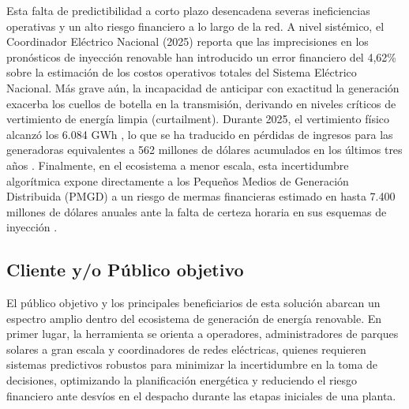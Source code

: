 Esta falta de predictibilidad a corto plazo desencadena severas ineficiencias operativas y un alto riesgo financiero a lo largo de la red. A nivel sistémico, el Coordinador Eléctrico Nacional (2025) reporta que las imprecisiones en los pronósticos de inyección renovable han introducido un error financiero del 4,62\% sobre la estimación de los costos operativos totales del Sistema Eléctrico Nacional. Más grave aún, la incapacidad de anticipar con exactitud la generación exacerba los cuellos de botella en la transmisión, derivando en niveles críticos de vertimiento de energía limpia (curtailment). Durante 2025, el vertimiento físico alcanzó los 6.084 GWh \cite{acera2025}, lo que se ha traducido en pérdidas de ingresos para las generadoras equivalentes a 562 millones de dólares acumulados en los últimos tres años \cite{ember2025}. Finalmente, en el ecosistema a menor escala, esta incertidumbre algorítmica expone directamente a los Pequeños Medios de Generación Distribuida (PMGD) a un riesgo de mermas financieras estimado en hasta 7.400 millones de dólares anuales ante la falta de certeza horaria en sus esquemas de inyección \cite{gpm2025}.

\begin{table}[htbp]
  \centering
  \caption{\label{tab:impacto_financiero} Resumen del impacto operativo y financiero por incertidumbre predictiva.}
\end{table}

\subsection{Cliente y/o Público objetivo}
El público objetivo y los principales beneficiarios de esta solución abarcan un espectro amplio dentro del ecosistema de generación de energía renovable. En primer lugar, la herramienta se orienta a operadores, administradores de parques solares a gran escala y coordinadores de redes eléctricas, quienes requieren sistemas predictivos robustos para minimizar la incertidumbre en la toma de decisiones, optimizando la planificación energética y reduciendo el riesgo financiero ante desvíos en el despacho durante las etapas iniciales de una planta.

